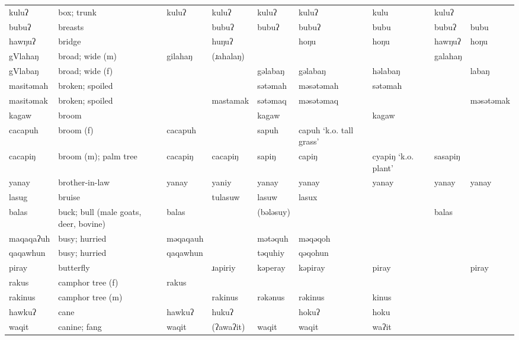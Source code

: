 \begin{landscape}
\begin{longtable}{*{9}{>{\raggedright\arraybackslash}p{}}}
\text{*}kuluʔ        & box; trunk & kuluʔ & kuluʔ & kuluʔ & kuluʔ & kulu & kuluʔ & \\
\text{*}bubuʔ        & breasts &  & bubuʔ & bubuʔ & bubuʔ & bubu & bubuʔ & bubu\\
\text{*}hawŋuʔ       & bridge &  & huŋuʔ &  & hoŋu & hoŋu & hawŋuʔ & hoŋu\\
\text{*}gVlahaŋ      & broad; wide (m) & gilahaŋ & (ɹahalaŋ) &  &  &  & galahaŋ & \\
\text{*}gVlabaŋ      & broad; wide (f) &  &  & gəlabaŋ & gəlabaŋ & həlabaŋ &  & labaŋ\\
\text{*}masitəmah    & broken; spoiled &  &  & sətəmah & məsətəmah & sətəmah &  & \\
\text{*}masitəmak    & broken; spoiled &  & mastamak & sətəmaq & məsətəmaq &  &  & məsətəmak\\
\text{*}kagaw        & broom &  &  & kagaw &  & kagaw &  & \\
\text{*}cacapuh      & broom (f) & cacapuh &  & sapuh & capuh `k.o. tall grass' &  &  & \\
\text{*}cacapiŋ      & broom (m); \newline palm tree & cacapiŋ & cacapiŋ & sapiŋ & capiŋ & cyapiŋ \newline `k.o. plant' & sasapiŋ & \\
\text{*}yanay        & brother-in-law & yanay & yaniy & yanay & yanay & yanay & yanay & yanay\\
\text{*}lasug        & bruise &  & tulasuw & lasuw & lasux &  &  & \\
\text{*}balas        & buck; bull (male goats, deer, bovine) & balas &  & (bələsuy) &  &  & balas & \\
\text{*}maqaqaʔuh    & busy; hurried & məqaqauh &  & mətəquh & məqəqoh &  &  & \\
\text{*}qaqawhun     & busy; hurried & qaqawhun &  & təquhiy & qəqohun &  &  & \\
\text{*}piray       & butterfly &  & ɹapiriy & kəperay & kəpiray & piray &  & piray\\
\text{*}rakus        & camphor tree (f) & rakus &  &  &  &  &  & \\
\text{*}rakinus      & camphor tree (m) &  & rakinus & rəkənus & rəkinus & kinus &  & \\
\text{*}hawkuʔ       & cane & hawkuʔ & hukuʔ &  & hokuʔ & hoku &  & \\
\text{*}waqit        & canine; fang & waqit & (ʔawaʔit) & waqit & waqit & waʔit &  & \\

\end{longtable}
\end{landscape}
